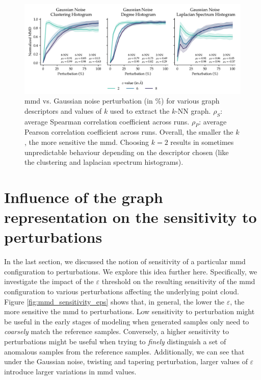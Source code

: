 \begin{figure}
  \includegraphics[width=\textwidth]{./figures/results/res_1_4.pdf}
  \caption[Influence of $k$ on the resulting \acrshort{mmd} values.]{\acrshort{mmd} vs. Gaussian noise
perturbation (in \%) for various graph descriptors and values of $k$ used to
extract the $k$-NN graph. $\rho_{S}$: average Spearman correlation
coefficient across runs. $\rho_{P}$: average Pearson correlation coefficient
across runs. Overall, the smaller the $k$, the more sensitive the
\acrshort{mmd}. Choosing $k=2$ results in sometimes unpredictable behaviour depending on
the descriptor chosen (like the clustering and laplacian spectrum histograms).}
  \label{fig:k_vs_turbulence_gaussian_noise}

\end{figure}


\section{Influence of the graph representation on the sensitivity to perturbations}\label{sec:results_sensitivity}

In the last section, we discussed the notion of sensitivity of a particular \acrshort{mmd}
configuration to perturbations. We explore this idea further here. Specifically,
we investigate the impact of the $\varepsilon$ threshold on the resulting
sensitivity of the \acrshort{mmd} configuration to various perturbations affecting the
underlying point cloud. Figure \ref{fig:mmd_sensitivity_eps} shows that, in
general, the lower the $\varepsilon$, the more sensitive the \acrshort{mmd} to
perturbations. Low sensitivity to perturbation might be useful in the early
stages of modeling when generated samples only need to \emph{coarsely} match
the reference samples. Conversely, a higher sensitivity to perturbations might
be useful when trying to \emph{finely} distinguish a set of anomalous samples
from the reference samples. Additionally, we can see that under the Gaussian
noise, twisting and tapering perturbation, larger values of $\varepsilon$
introduce larger variations in \acrshort{mmd} values.

